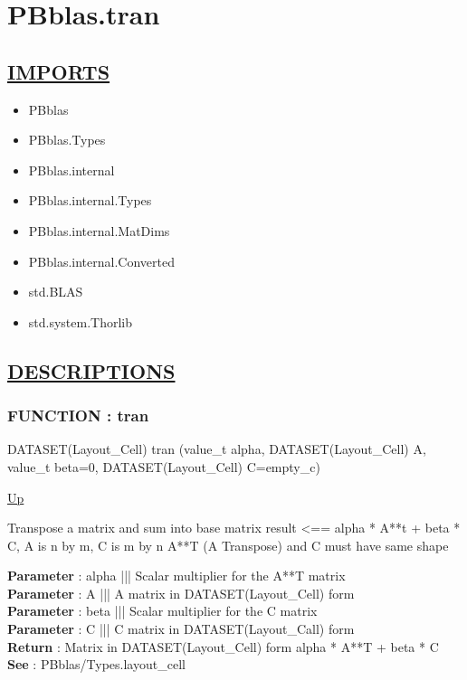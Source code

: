 \chapter*{PBblas.tran}
\hypertarget{ecldoc:toc:PBblas.tran}{}

\section*{\underline{IMPORTS}}
\begin{itemize}
\item PBblas
\item PBblas.Types
\item PBblas.internal
\item PBblas.internal.Types
\item PBblas.internal.MatDims
\item PBblas.internal.Converted
\item std.BLAS
\item std.system.Thorlib
\end{itemize}

\section*{\underline{DESCRIPTIONS}}
\subsection*{FUNCTION : tran}
\hypertarget{ecldoc:pbblas.tran}{}
\begin{minipage}[t]{\textwidth}
\begin{flushleft}
DATASET(Layout\_Cell) tran (value\_t alpha, DATASET(Layout\_Cell) A, value\_t beta=0, DATASET(Layout\_Cell) C=empty\_c)
\end{flushleft}
\end{minipage}
\hyperlink{ecldoc:toc:PBblas}{Up}

\par
Transpose a matrix and sum into base matrix result <== alpha * A**t + beta * C, A is n by m, C is m by n A**T (A Transpose) and C must have same shape
\par
\textbf{Parameter} : alpha ||| Scalar multiplier for the A**T matrix \\
\textbf{Parameter} : A ||| A matrix in DATASET(Layout\_Cell) form \\
\textbf{Parameter} : beta ||| Scalar multiplier for the C matrix \\
\textbf{Parameter} : C ||| C matrix in DATASET(Layout\_Call) form \\
\textbf{Return} : Matrix in DATASET(Layout\_Cell) form alpha * A**T + beta * C \\
\textbf{See} : PBblas/Types.layout\_cell \\
